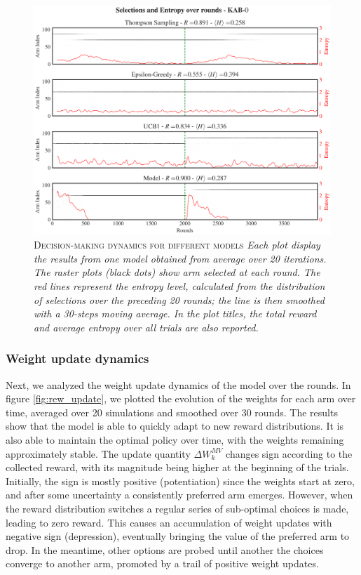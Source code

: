 \begin{figure}[H]
    \centering
    \includegraphics[width=1.0\textwidth]{figures/selections_entropy_KABv0.png}
    \caption{\textsc{Decision-making dynamics for different models} \textit{Each plot display the results from one model obtained from average over 20 iterations. The raster plots (black dots) show arm selected at each round. The red lines represent the entropy level, calculated from the distribution of selections over the preceding 20
    rounds; the line is then smoothed with a 30-steps moving average. In the plot titles, the total reward and average entropy over all trials are also reported.}}
    \label{fig:entropy_fig1}
\end{figure}


\subsubsection{Weight update dynamics}
\noindent Next, we analyzed the weight update dynamics of the model over the rounds.
In figure \ref{fig:rew_update}, we plotted the evolution of the weights for each arm over time, averaged over 20 simulations and smoothed over 30 rounds.
The results show that the model is able to quickly adapt to new reward distributions. It is also able to maintain the optimal policy over time, with the weights remaining approximately stable.
The update quantity $\Delta W_{k}^{MV}$ changes sign according to the collected reward, with its magnitude being higher at the beginning of the trials. Initially, the sign is mostly positive (potentiation) since the weights start at zero, and after some uncertainty a consistently preferred arm
emerges.
However, when the reward distribution switches a regular
series of sub-optimal choices is made, leading to zero reward.
This causes an accumulation of weight updates with negative sign (depression), eventually bringing the value of the preferred arm to drop. In the meantime, other options are probed until another the choices converge to another arm, promoted by a trail of positive weight updates.

